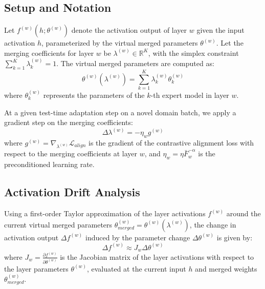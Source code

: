 \documentclass{article}
\theoremstyle{plain}
\theoremstyle{definition}
\theoremstyle{remark}
\begin{document}
\subsection{Setup and Notation}
Let $f^{(w)}(h; \theta^{(w)})$ denote the activation output of layer $w$ given the input activation $h$, parameterized by the virtual merged parameters $\theta^{(w)}$.
Let the merging coefficients for layer $w$ be $\lambda^{(w)} \in \mathbb{R}^K$, with the simplex constraint $\sum_{k=1}^K \lambda_k^{(w)} = 1$. The virtual merged parameters are computed as:
\begin{equation}
  \theta^{(w)}(\lambda^{(w)}) = \sum_{k=1}^K \lambda_k^{(w)} \theta_k^{(w)}
\end{equation}
where $\theta_k^{(w)}$ represents the parameters of the $k$-th expert model in layer $w$.

At a given test-time adaptation step on a novel domain batch, we apply a gradient step on the merging coefficients:
\begin{equation}
  \Delta \lambda^{(w)} = -\eta_w g^{(w)}
\end{equation}
where $g^{(w)} = \nabla_{\lambda^{(w)}} \mathcal{L}_{align}$ is the gradient of the contrastive alignment loss with respect to the merging coefficients at layer $w$, and $\eta_w = \eta \bar{F}_w^{-\alpha}$ is the preconditioned learning rate.

\subsection{Activation Drift Analysis}
Using a first-order Taylor approximation of the layer activations $f^{(w)}$ around the current virtual merged parameters $\theta_{merged}^{(w)} = \theta^{(w)}(\lambda^{(w)})$, the change in activation output $\Delta f^{(w)}$ induced by the parameter change $\Delta \theta^{(w)}$ is given by:
\begin{equation}
  \Delta f^{(w)} \approx J_w \Delta \theta^{(w)}
\end{equation}
where $J_w = \frac{\partial f^{(w)}}{\partial \theta^{(w)}}$ is the Jacobian matrix of the layer activations with respect to the layer parameters $\theta^{(w)}$, evaluated at the current input $h$ and merged weights $\theta_{merged}^{(w)}$.
\end{document}
